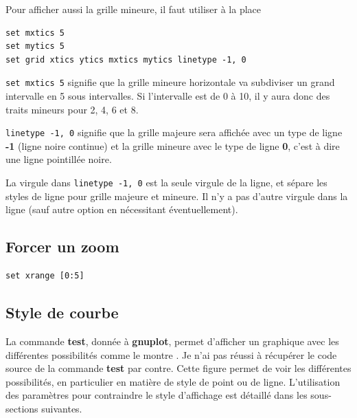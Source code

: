 \documentclass[a4paper,twoside]{article}
\begin{document}
Pour afficher aussi la grille mineure, il faut utiliser à la place 
\begin{verbatim}
set mxtics 5
set mytics 5
set grid xtics ytics mxtics mytics linetype -1, 0
\end{verbatim}
\texttt{set mxtics 5} signifie que la grille mineure horizontale va subdiviser un grand intervalle en 5 sous intervalles. Si l'intervalle est de 0 à 10, il y aura donc des traits mineurs pour 2, 4, 6 et 8. 

\texttt{linetype -1, 0} signifie que la grille majeure sera affichée avec un type de ligne \textbf{-1} (ligne noire continue) et la grille mineure avec le type de ligne \textbf{0}, c'est à dire une ligne pointillée noire.

\begin{attention}
La virgule dans \texttt{linetype -1, 0} est la seule virgule de la ligne, et sépare les styles de ligne pour grille majeure et mineure. Il n'y a pas d'autre virgule dans la ligne (sauf autre option en nécessitant éventuellement).
\end{attention}




\subsection{Forcer un zoom}
\begin{verbatim}
set xrange [0:5]
\end{verbatim}

\subsection{Style de courbe}
La commande \textbf{test}, donnée à \textbf{gnuplot}, permet d'afficher un graphique avec les différentes possibilités comme le montre . Je n'ai pas réussi à récupérer le code source de la commande \textbf{test} par contre. Cette figure permet de voir les différentes possibilités, en particulier en matière de style de point ou de ligne. L'utilisation des paramètres pour contraindre le style d'affichage est détaillé dans les sous-sections suivantes.
\end{document}

